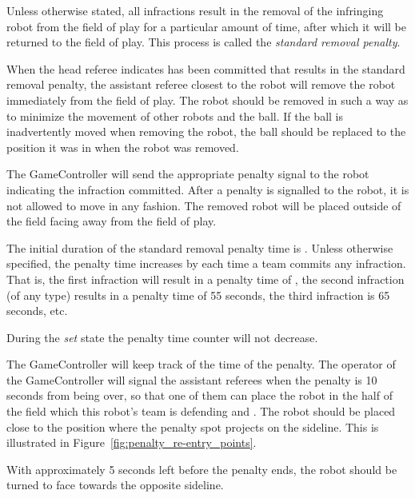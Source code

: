 Unless otherwise stated, all infractions result in the removal of the infringing robot from the field of play for a particular amount of time, after which it will be returned to the field of play. This process is called the \textit{standard removal penalty}.

When the head referee indicates  has been committed that results in the standard removal penalty, the assistant referee closest to the robot will remove the robot immediately from the field of play. The robot should be removed in such a way as to minimize the movement of other robots and the ball. If the ball is inadvertently moved when removing the robot, the ball should be replaced to the position it was in when the robot was removed.

The GameController will send the appropriate penalty signal to the robot indicating the infraction committed. After a penalty is signalled to the robot, it is not allowed to move in any fashion. The removed robot will be placed outside of the field facing away from the field of play.

The initial duration of the standard removal penalty time is \StandardPenaltyTime.
Unless otherwise specified, the penalty time increases by \StandardPenaltyIncrease each time a team commits any infraction.
That is, the first infraction will result in a penalty time of \StandardPenaltyTime, the second infraction (of any type) results in a penalty time of 55 seconds, the third infraction is 65 seconds, etc.

During the \emph{set} state the penalty time counter will not decrease.

The GameController will keep track of the time of the penalty. The operator of the GameController will signal the assistant referees when the penalty is 10 seconds from being over, so that one of them can place the robot in the half of the field which this robot's team is defending and . The robot should be placed close to the position where the penalty spot projects on the sideline. This is illustrated in Figure~\ref{fig:penalty_re-entry_points}.

With approximately 5 seconds left before the penalty ends, the robot should be turned to face towards the opposite sideline.

